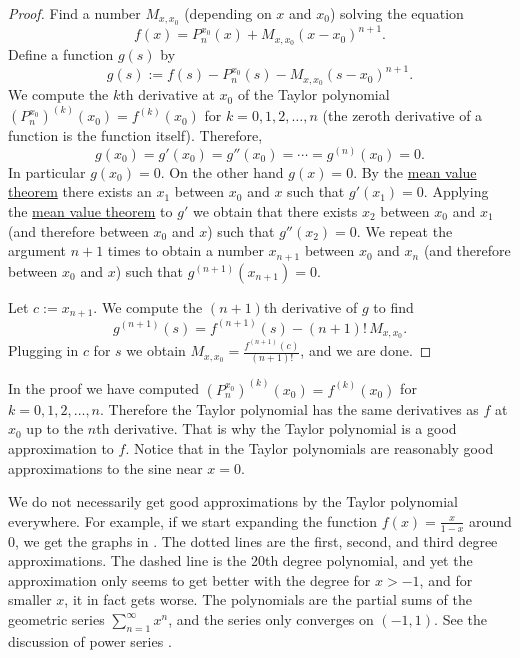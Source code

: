 \begin{proof}
Find a number $M_{x,x_0}$ (depending on $x$ and $x_0$) solving the equation
\begin{equation*}
f(x)=P_{n}^{x_0}(x)+M_{x,x_0}{(x-x_0)}^{n+1} .
\end{equation*}
Define a function $g(s)$ by
\begin{equation*}
g(s) := f(s)-P_n^{x_0}(s)-M_{x,x_0}{(s-x_0)}^{n+1} .
\end{equation*}
We compute
the $k$th derivative at $x_0$ of the Taylor polynomial
${(P_n^{x_0})}^{(k)}(x_0) = f^{(k)}(x_0)$ for
$k=0,1,2,\ldots,n$ (the zeroth derivative of a function is the function
itself).  Therefore,
\begin{equation*}
g(x_0) = g'(x_0) = g''(x_0) = \cdots = g^{(n)}(x_0) = 0 .
\end{equation*}
In particular $g(x_0) = 0$.
On the other hand $g(x) = 0$.  By the
\hyperref[thm:mvt]{mean value theorem}
there exists an $x_1$ between $x_0$ and $x$ such that $g'(x_1) = 0$.
Applying the \hyperref[thm:mvt]{mean value theorem}
to $g'$ we obtain that there exists
$x_2$ between $x_0$ and $x_1$ (and therefore between $x_0$ and $x$)
such that $g''(x_2) = 0$.  We repeat the
argument $n+1$ times to obtain a number $x_{n+1}$ between $x_0$ and $x_n$
(and therefore between $x_0$ and $x$) such that $g^{(n+1)}(x_{n+1}) = 0$.

Let $c:=x_{n+1}$.
We compute the $(n+1)$th derivative of $g$ to find
\begin{equation*}
g^{(n+1)}(s) = f^{(n+1)}(s)-(n+1)!\,M_{x,x_0} .
\end{equation*}
Plugging in $c$ for $s$ we obtain $M_{x,x_0} = \frac{f^{(n+1)}(c)}{(n+1)!}$, and
we are done.
\end{proof}

In the proof we have computed 
${(P_n^{x_0})}^{(k)}(x_0) = f^{(k)}(x_0)$ for $k=0,1,2,\ldots,n$.
Therefore the Taylor polynomial has the same derivatives as $f$ at $x_0$
up to the $n$th derivative.  That is why the Taylor polynomial is
a good approximation to $f$.
Notice that in  the Taylor polynomials are
reasonably good approximations to the sine near $x=0$.

We do not necessarily get good approximations
by the Taylor polynomial everywhere.
For example, if we start expanding the function $f(x) =
\frac{x}{1-x}$ around 0, we get the graphs in
.  The dotted lines are the first, second, and
third degree approximations.  The dashed line is
the 20th degree polynomial, and yet the approximation only seems to get
better with the degree for $x > -1$, and for smaller $x$, it in fact gets worse.
The polynomials
are the partial sums of the geometric series $\sum_{n=1}^\infty x^n$,
and the series only converges on $(-1,1)$.
See the discussion of power series
.


